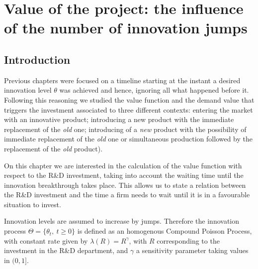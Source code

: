 \chapter{Value of the project: the influence of the number of innovation jumps}
\label{chapter:max}



\section{Introduction}
\label{section:max_intro}

Previous chapters were focused on a timeline starting at the instant a desired innovation level $\theta$ was achieved and hence, ignoring all what happened before it. Following this reasoning we 
studied the value function and the demand value that triggers the investment associated to three different contexts: entering the market with an innovative product; introducing a new product with the immediate replacement of the \textit{old} one; introducing of a \textit{new} product with the possibility of immediate replacement of the \textit{old} one or simultaneous production followed by the replacement of the \textit{old} product).

On this chapter we are interested
in the calculation of the value function with respect to the R\&D investment, taking into account the waiting time until the innovation breakthrough takes place.
This allows us to state a relation between the R\&D investment and the time a firm needs to wait until it is in a favourable situation to invest.



Innovation levels are assumed to increase by jumps. Therefore the innovation process
$\Theta=\{ \theta_t, \ t \geq 0 \}$ is defined as an homogenous Compound Poisson Process, with constant rate given by $\lambda(R)=R^\gamma$, with $R$ corresponding to the investment in the R\&D department, and $\gamma$ a sensitivity parameter taking values in $(0,1]$.

